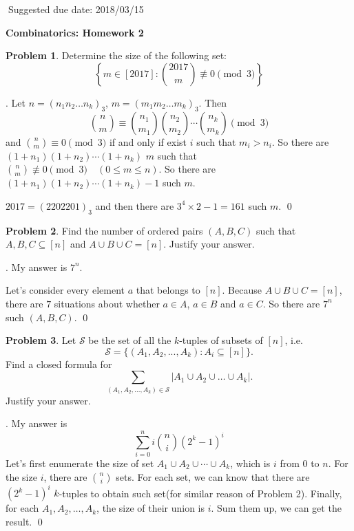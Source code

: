 \documentclass[12pt]{article}
\theoremstyle{definition}
\newtheorem{hw}{Problem}
\newenvironment{sol}
  {\par\vspace{3mm}\noindent{\it Solution}.}
  {\qed}
\begin{document}
$\;$\hfill Suggested due date: 2018/03/15

\bigskip

\begin{center}
{\LARGE\bf Combinatorics: Homework 2}
\end{center}

\bigskip

\begin{hw}
Determine the size of the following set:
\[ \left\{m \in [2017] : \binom{2017}{m} \not\equiv 0 \pmod 3 \right\} \]
\end{hw}

\begin{sol}
	Let $n = (n_1n_2\dots n_k)_3$, $m = (m_1m_2\dots m_k)_3$.
	Then 
	$$
		\binom{n}{m} \equiv \binom{n_1}{m_1}\binom{n_2}{m_2}\cdots\binom{n_k}{m_k} \pmod{3}
	$$
	and $\binom{n}{m} \equiv 0 \pmod{3}$ if and only if exist $i$ such that $m_i > n_i$. So there are $(1+n_1)(1+n_2)\cdots(1+n_k)$ $m$ such that $\binom{n}{m} \not \equiv 0 \pmod{3} \quad (0 \leq m \leq n)$. So there are $(1+n_1)(1+n_2)\cdots(1+n_k)-1$ such $m$.
	
	$2017 = (2202201)_3$ and then there are $3^4 \times 2 -1= 161$ such $m$.
\end{sol}

\begin{hw}
Find the number of ordered pairs $(A, B, C)$ such that $A, B, C
\subseteq [n]$ and $A \cup B \cup C = [n]$. Justify your answer.
\end{hw}

\begin{sol}
	My answer is $7^n$.
	
	Let's consider every element $a$ that belongs to $[n]$. Because $A\cup B\cup C = [n]$, there are $7$ situations about whether $a \in A$, $a \in B$ and $a \in C$. So there are $7^n$ such $(A,B,C)$.
\end{sol}

\begin{hw}
Let $\mathcal{S}$ be the set of all the $k$-tuples of subsets of
$[n]$, i.e.
\[  \mathcal{S} = \{(A_1, A_2, ..., A_k): A_i \subseteq [n] \}.\]
Find a closed formula for
\[ \sum_{(A_1, A_2, ..., A_k) \in \mathcal{S}} |A_1 \cup A_2 \cup
  \dots \cup A_k|.\]
Justify your answer.
\end{hw}

\begin{sol}
	My answer is 
	$$
		\sum_{i = 0}^{n}i\binom{n}{i}(2^k-1)^i
	$$
	Let's first enumerate the size of set $A_1\cup A_2 \cup \cdots \cup A_k$, which is $i$ from $0$ to $n$. For the size $i$, there are $\binom{n}{i}$ sets. For each set, we can know that there are $(2^k-1)^i$ $k$-tuples to obtain such set(for similar reason of Problem 2). Finally, for each $A_1,A_2,\dots,A_k$, the size of their union is $i$. Sum them up, we can get the result.
\end{sol}
\end{document}
